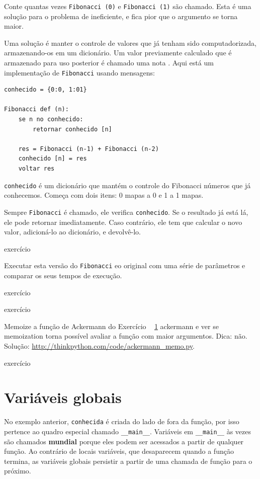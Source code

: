 \documentclass[10pt]{book}
\begin{document}
\begin{v erbatim}
Conte quantas vezes {\tt Fibonacci (0)} e {\tt Fibonacci (1)} são
chamado. Esta é uma solução para o problema de ineficiente, e fica
pior que o argumento se torna maior.

Uma solução é manter o controle de valores que já tenham sido
computadorizada, armazenando-os em um dicionário. Um valor previamente calculado
que é armazenado para uso posterior é chamado uma nota {\bf}. Aqui está um
implementação de {\tt Fibonacci} usando mensagens:

\begin{verbatim}
conhecido = {0:0, 1:01}

Fibonacci def (n):
    se n no conhecido:
        retornar conhecido [n]

    res = Fibonacci (n-1) + Fibonacci (n-2)
    conhecido [n] = res
    voltar res
\end{verbatim}
%
{\tt conhecido} é um dicionário que mantém o controle do Fibonacci
números que já conhecemos. Começa com
dois itens: 0 mapas a 0 e 1 a 1 mapas.

Sempre {\tt Fibonacci} é chamado, ele verifica {\tt conhecido}.
Se o resultado já está lá, ele pode retornar
imediatamente. Caso contrário, ele tem que
calcular o novo valor, adicioná-lo ao dicionário, e devolvê-lo.

\begin{} exercício

Executar esta versão do {\tt Fibonacci} eo original com
uma série de parâmetros e comparar os seus tempos de execução.

\end{} exercício

\begin{} exercício

Memoize a função de Ackermann do Exercício ~ \ref {} ackermann e ver se
memoization torna possível avaliar a função com maior
argumentos. Dica: não.
Solução: \url{http://thinkpython.com/code/ackermann_memo.py}.

\end{} exercício


\section{Variáveis ​​globais}

No exemplo anterior, {\tt conhecida} é criada do lado de fora da função,
por isso pertence ao quadro especial chamado \verb "__main__".
Variáveis ​​em \verb "__main__" às vezes são chamados {\bf mundial}
porque eles podem ser acessados ​​a partir de qualquer função. Ao contrário de locais
variáveis, que desaparecem quando a função termina, as variáveis ​​globais
persistir a partir de uma chamada de função para o próximo.


\end{v erbatim}
\end{document}
